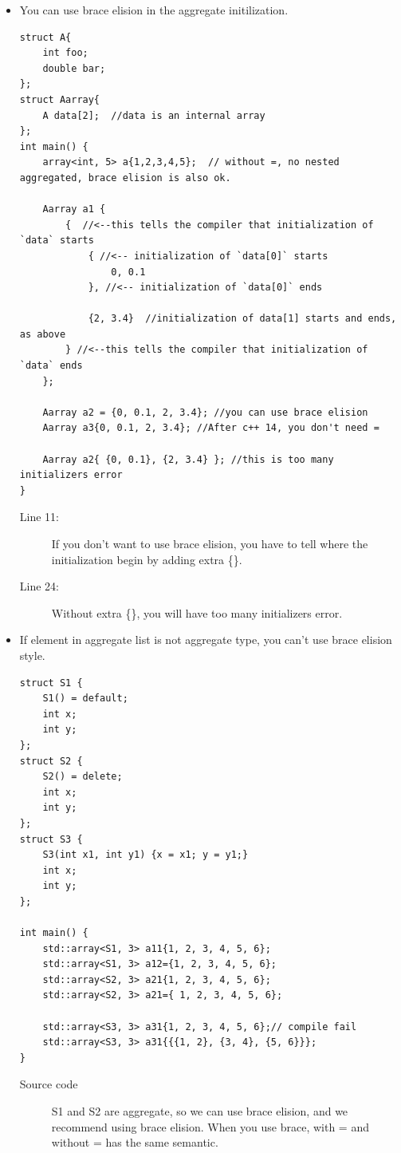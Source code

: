\documentclass[a4paper,11pt,twoside]{book}
\begin{document}
\begin{itemize}
    \item You can use brace elision in the aggregate initilization.
\begin{lstlisting}
struct A{
	int foo;
	double bar;
};
struct Aarray{
	A data[2];  //data is an internal array
};
int main() {
	array<int, 5> a{1,2,3,4,5};  // without =, no nested aggregated, brace elision is also ok.
	
	Aarray a1 {
		{  //<--this tells the compiler that initialization of `data` starts
			{ //<-- initialization of `data[0]` starts
				0, 0.1
			}, //<-- initialization of `data[0]` ends
			
			{2, 3.4}  //initialization of data[1] starts and ends, as above
		} //<--this tells the compiler that initialization of `data` ends
	};

	Aarray a2 = {0, 0.1, 2, 3.4}; //you can use brace elision
	Aarray a3{0, 0.1, 2, 3.4}; //After c++ 14, you don't need =

	Aarray a2{ {0, 0.1}, {2, 3.4} }; //this is too many initializers error
}
\end{lstlisting}
\begin{description}
	\item[Line 11:] If you don't want to use brace elision, you have to tell where the initialization begin by adding extra \{\}.
	\item[Line 24:] Without extra \{\}, you will have too many initializers error.
\end{description}

		\item If element in aggregate list is not aggregate type, you can't use brace elision style. 
\begin{lstlisting}
struct S1 {
    S1() = default;
    int x;
    int y;
};
struct S2 {
    S2() = delete;
    int x;
    int y;
};
struct S3 {
    S3(int x1, int y1) {x = x1; y = y1;}
    int x;
    int y;
};

int main() {
    std::array<S1, 3> a11{1, 2, 3, 4, 5, 6};
    std::array<S1, 3> a12={1, 2, 3, 4, 5, 6};
    std::array<S2, 3> a21{1, 2, 3, 4, 5, 6};
    std::array<S2, 3> a21={ 1, 2, 3, 4, 5, 6};  

    std::array<S3, 3> a31{1, 2, 3, 4, 5, 6};// compile fail   
    std::array<S3, 3> a31{{{1, 2}, {3, 4}, {5, 6}}};
}
\end{lstlisting}
\begin{description}
		\item[Source code] S1 and S2 are aggregate, so we can use brace elision, and we recommend using brace elision. When you use brace, with = and without = has the same semantic.


\end{description}
\end{itemize}
\end{document}
